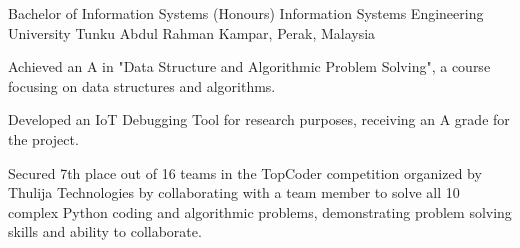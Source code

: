 

\begin{cventries}

  \cventry
    {Bachelor of Information Systems (Honours) Information Systems Engineering} %
    {University Tunku Abdul Rahman} %
    {Kampar, Perak, Malaysia} %
    {} %
    {
      \begin{cvitems} %
        \item {Achieved an A in "Data Structure and Algorithmic Problem Solving", a course focusing on data structures and algorithms.}
        \item {Developed an IoT Debugging Tool for research purposes, receiving an A grade for the project.}
        \item {Secured 7th place out of 16 teams in the TopCoder competition organized by Thulija Technologies by collaborating with a team member to solve all 10 complex Python coding and algorithmic problems, demonstrating problem solving skills and ability to collaborate.}
      \end{cvitems}
    }
\end{cventries}
